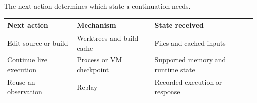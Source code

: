 \begin{frame}{The next action determines which state a continuation needs.}
\vspace{0pt}
{\fontsize{12.5}{15}\selectfont\renewcommand{\arraystretch}{1.45}
\begin{tabularx}{\textwidth}{@{}L{3.5cm}L{4.0cm}Y@{}}
\toprule
Next action & Mechanism & State received\\
\midrule
Edit source or build & Worktrees and build cache & Files and cached inputs\\
Continue live execution & Process or VM checkpoint & Supported memory and runtime state\\
Reuse an observation & Replay & Recorded execution or response\\
\bottomrule
\end{tabularx}\par}

\end{frame}
